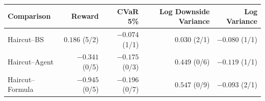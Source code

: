 \begingroup
\renewcommand{\arraystretch}{1.05}
\setlength{\tabcolsep}{7pt}
\begin{tabular}{@{}lrrrr@{}}
\toprule
Comparison & Reward & CVaR 5\% & Log Downside Variance & Log Variance \\
\midrule
Haircut--BS & $0.186$ (5/2) & $-0.074$ (1/1) & $0.030$ (2/1) & $-0.080$ (1/1) \\
Haircut--Agent & $-0.341$ (0/5) & $-0.175$ (0/3) & $0.449$ (0/6) & $-0.119$ (1/1) \\
Haircut--Formula & $-0.945$ (0/5) & $-0.196$ (0/7) & $0.547$ (0/9) & $-0.093$ (2/1) \\
\bottomrule
\end{tabular}
\endgroup
